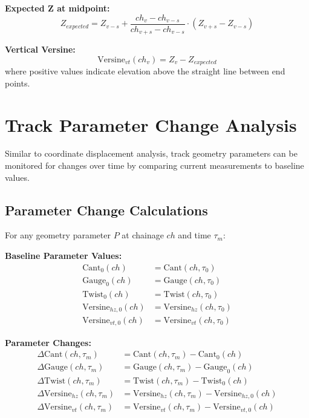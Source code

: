 \documentclass{article}
\begin{document}
\textbf{Expected Z at midpoint:}
\begin{equation}
Z_{expected} = Z_{v-s} + \frac{ch_v - ch_{v-s}}{ch_{v+s} - ch_{v-s}} \cdot (Z_{v+s} - Z_{v-s})
\end{equation}

\textbf{Vertical Versine:}
\begin{equation}
\text{Versine}_{vt}(ch_v) = Z_v - Z_{expected}
\end{equation}
where positive values indicate elevation above the straight line between end points.

\section{Track Parameter Change Analysis}
Similar to coordinate displacement analysis, track geometry parameters can be monitored for changes over time by comparing current measurements to baseline values.

\subsection{Parameter Change Calculations}
For any geometry parameter $P$ at chainage $ch$ and time $\tau_m$:

\textbf{Baseline Parameter Values:}
\begin{align}
\text{Cant}_0(ch) &= \text{Cant}(ch, \tau_0) \\
\text{Gauge}_0(ch) &= \text{Gauge}(ch, \tau_0) \\
\text{Twist}_0(ch) &= \text{Twist}(ch, \tau_0) \\
\text{Versine}_{hz,0}(ch) &= \text{Versine}_{hz}(ch, \tau_0) \\
\text{Versine}_{vt,0}(ch) &= \text{Versine}_{vt}(ch, \tau_0)
\end{align}

\textbf{Parameter Changes:}
\begin{align}
\Delta\text{Cant}(ch, \tau_m) &= \text{Cant}(ch, \tau_m) - \text{Cant}_0(ch) \\
\Delta\text{Gauge}(ch, \tau_m) &= \text{Gauge}(ch, \tau_m) - \text{Gauge}_0(ch) \\
\Delta\text{Twist}(ch, \tau_m) &= \text{Twist}(ch, \tau_m) - \text{Twist}_0(ch) \\
\Delta\text{Versine}_{hz}(ch, \tau_m) &= \text{Versine}_{hz}(ch, \tau_m) - \text{Versine}_{hz,0}(ch) \\
\Delta\text{Versine}_{vt}(ch, \tau_m) &= \text{Versine}_{vt}(ch, \tau_m) - \text{Versine}_{vt,0}(ch)
\end{align}
\end{document}
